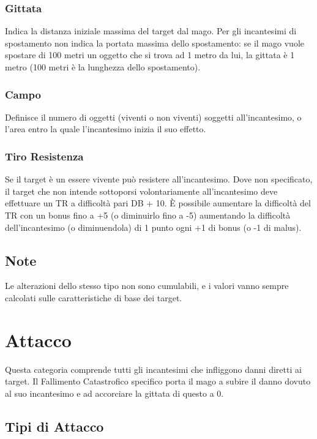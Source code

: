 \subsubsection{Gittata} 

Indica la distanza iniziale massima del
target dal mago. Per gli incantesimi di spostamento non indica la
portata massima dello spostamento: se il mago vuole spostare di 100
metri un oggetto che si trova ad 1 metro da lui, la gittata \`e 1
metro (100 metri \`e la lunghezza dello spostamento).

\subsubsection{Campo} 

Definisce il numero di oggetti
(viventi o non viventi) soggetti all'incantesimo, o l'area entro la
quale l'incantesimo inizia il suo effetto.

\subsubsection{Tiro Resistenza} Se
il target \`e un essere vivente pu\`o resistere all'incantesimo.
Dove non specificato, il target che non intende sottoporsi
volontariamente all'incantesimo deve effettuare un TR a difficolt\`a
pari DB + 10. \`E possibile aumentare la difficolt\`a del TR con un
bonus fino a +5 (o diminuirlo fino a -5) aumentando la difficolt\`a
dell'incantesimo (o diminuendola) di 1 punto ogni +1 di bonus (o -1 di
malus).

\subsection{Note} 
Le alterazioni dello stesso tipo non sono
cumulabili, e i valori vanno sempre calcolati sulle caratteristiche di
base dei target.

\section{Attacco}

Questa categoria comprende tutti gli incantesimi che infliggono danni
diretti ai target.  Il Fallimento Catastrofico specifico porta il mago
a subire il danno dovuto al suo incantesimo e ad accorciare la gittata
di questo a 0.

\subsection{Tipi di Attacco}

